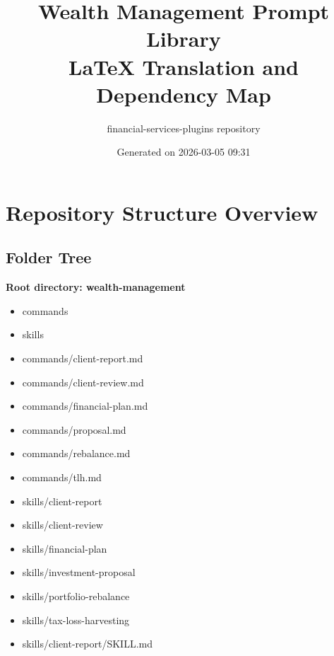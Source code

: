 \documentclass[11pt]{article}
\title{Wealth Management Prompt Library\\LaTeX Translation and Dependency Map}
\author{financial-services-plugins repository}
\date{Generated on 2026-03-05 09:31 }
\begin{document}
\maketitle
\tableofcontents
\newpage

\section{Repository Structure Overview}

\subsection{Folder Tree}
\textbf{Root directory: wealth-management}
\begin{itemize}[leftmargin=*,itemsep=1pt,topsep=2pt]
\item \hspace*{0.0em}commands
\item \hspace*{0.0em}skills
\item \hspace*{0.9em}commands/client-report.md
\item \hspace*{0.9em}commands/client-review.md
\item \hspace*{0.9em}commands/financial-plan.md
\item \hspace*{0.9em}commands/proposal.md
\item \hspace*{0.9em}commands/rebalance.md
\item \hspace*{0.9em}commands/tlh.md
\item \hspace*{0.9em}skills/client-report
\item \hspace*{0.9em}skills/client-review
\item \hspace*{0.9em}skills/financial-plan
\item \hspace*{0.9em}skills/investment-proposal
\item \hspace*{0.9em}skills/portfolio-rebalance
\item \hspace*{0.9em}skills/tax-loss-harvesting
\item \hspace*{1.8em}skills/client-report/SKILL.md

\end{itemize}
\end{document}
